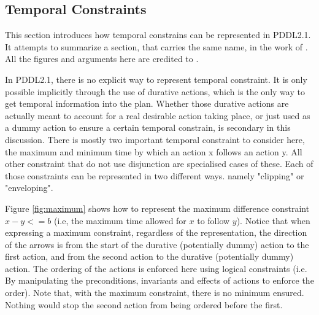 \documentclass
[a4paper
,english
,parskip=half
,bibliography=totoc
]{scrreprt}
\begin{document}
        \subsection{Temporal Constraints}
        This section introduces how temporal constrains can be represented in PDDL2.1. 
        It attempts to summarize a section, that carries the same name, in the work of \citet{HalseyLongFox2003}. All the figures and arguments here are credited to \citep{HalseyLongFox2003}.

        In PDDL2.1, there is no explicit way to represent temporal constraint.
        It is only possible implicitly through the use of durative actions, which is the only way to get temporal information into the plan.
        Whether those durative actions are actually meant to account for a real desirable action taking place, or just used as a dummy action to ensure a certain temporal constrain, is secondary in this discussion.
        There is mostly two important temporal constraint to consider here, the maximum and minimum time by which an action x follows an action y.
        All other constraint that do not use disjunction are specialised cases of these.
        Each of those constraints can be represented in two different ways. namely "clipping"  or "enveloping". 

        Figure \ref{fig:maximum} shows how to represent the maximum difference constraint \(x-y<=b\) (i.e, the maximum time allowed for \(x\) to follow \(y\)). Notice that when expressing a maximum constraint, regardless of the representation, the direction of the arrows is from the start of the durative (potentially dummy) action to the first action, and from the second action to the durative (potentially dummy) action. The ordering of the actions is enforced here using logical constraints (i.e. By manipulating the preconditions, invariants and effects of actions to enforce the order). Note that, with the maximum constraint, there is no minimum ensured. Nothing would stop the second action from being ordered before the first.
        
\end{document}
